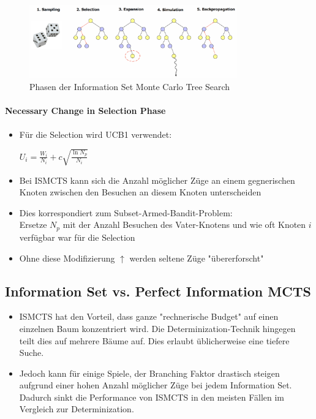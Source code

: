 \documentclass[a4paper]{article}
\begin{document}
		\begin{figure}[htb!]
			\centering
			\includegraphics[width=0.8\textwidth]{img/03_information_sets/ismcts.png}
			\caption{Phasen der Information Set Monte Carlo Tree Search}
			\label{fig:03_infoset_ismcts}
		\end{figure}
	
		\newpage
	
		\paragraph{Necessary Change in Selection Phase}
	
		\begin{itemize}
			\item Für die Selection wird UCB1 verwendet:
			
			$U_{i} = \frac{W_{i}}{N_{i}} + c \sqrt{\frac{\ln N_{p}}{N_{i}}}$
			
			\item Bei ISMCTS kann sich die Anzahl möglicher Züge an einem gegnerischen Knoten zwischen den Besuchen an diesem Knoten unterscheiden
			\item Dies korrespondiert zum Subset-Armed-Bandit-Problem: \\
			Ersetze $N_{p}$ mit der Anzahl Besuchen des Vater-Knotens und wie oft Knoten $i$ verfügbar war für die Selection
			\item Ohne diese Modifizierung $\uparrow$ werden seltene Züge "übererforscht"
		\end{itemize}
	
		\subsection{Information Set vs. Perfect Information MCTS}
		
		\begin{itemize}
			\item ISMCTS hat den Vorteil, dass ganze "rechnerische Budget" auf einen einzelnen Baum konzentriert wird.
			Die Determinization-Technik hingegen teilt dies auf mehrere Bäume auf.
			Dies erlaubt üblicherweise eine tiefere Suche.
			\item Jedoch kann für einige Spiele, der Branching Faktor drastisch steigen aufgrund einer hohen Anzahl möglicher Züge bei jedem Information Set.
			Dadurch sinkt die Performance von ISMCTS in den meisten Fällen im Vergleich zur Determinization.
		\end{itemize}
	
\end{document}
